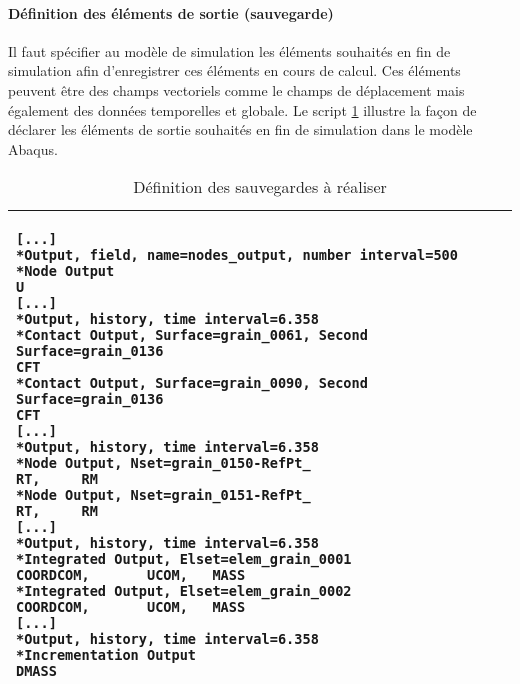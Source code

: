 \paragraph{Définition des éléments de sortie (sauvegarde)\\}
Il faut spécifier au modèle de simulation les éléments souhaités en fin de simulation afin d'enregistrer ces éléments en cours de calcul. Ces éléments peuvent être des champs vectoriels comme le champs de déplacement mais également des données temporelles et globale. Le script \ref{script05:sauvegarde_abaqus} illustre la façon de déclarer les éléments de sortie souhaités en fin de simulation dans le modèle Abaqus.
\begin{table}[h]\centering
	\begin{tabular}{p{}}
		\hline
		\begin{lstlisting}[language={}, breaklines=true]
[...]
*Output, field, name=nodes_output, number interval=500
*Node Output
U
[...]
*Output, history, time interval=6.358
*Contact Output, Surface=grain_0061, Second Surface=grain_0136
CFT
*Contact Output, Surface=grain_0090, Second Surface=grain_0136
CFT
[...]
*Output, history, time interval=6.358
*Node Output, Nset=grain_0150-RefPt_
RT,     RM
*Node Output, Nset=grain_0151-RefPt_
RT,     RM
[...]
*Output, history, time interval=6.358
*Integrated Output, Elset=elem_grain_0001
COORDCOM,       UCOM,   MASS
*Integrated Output, Elset=elem_grain_0002
COORDCOM,       UCOM,   MASS
[...]
*Output, history, time interval=6.358
*Incrementation Output
DMASS
		\end{lstlisting}\\
\hline
\end{tabular}
\caption{\label{script05:sauvegarde_abaqus}Définition des sauvegardes à réaliser}
\end{table}

\captionsetup[table]{name=Tableau, position=bottom}